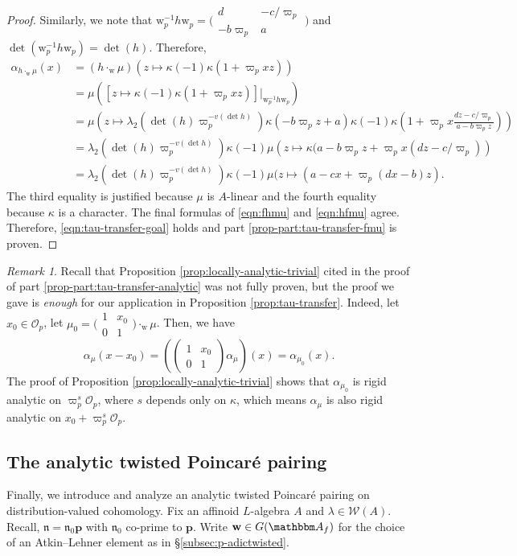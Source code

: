 \documentclass[10pt, twoside]{amsart}
\theoremstyle{plain}
\theoremstyle{definition}
\theoremstyle{remark}
\newtheorem{remark}[theorem]{Remark}
\numberwithin{equation}{subsection}
\def\A{\mathbbm A}
\def\p{\mathbf{p}}
\def\gn{\mathfrak n}
\def\scro{\mathscr O}
\def\scro{\mathscr O}
\def\scrw{\mathscr W}
\newcommand{\mat}[4]{\begin{pmatrix}#1&#2\\#3&#4\end{pmatrix}}
\newcommand{\smallmat}[4]{\bigl(\begin{smallmatrix}#1&#2\\#3&#4\end{smallmatrix}\bigr)}
\begin{document}
\begin{proof}
Similarly, we note that ${ \boldsymbol{\mathrm{w}}}_p^{-1}h { \boldsymbol{\mathrm{w}}}_p = \smallmat d{-c/\varpi_p}{-b\varpi_p}a$ and $\det({ \boldsymbol{\mathrm{w}}}_p^{-1}h{ \boldsymbol{\mathrm{w}}}_p) = \det(h)$. Therefore,
\begin{align}\label{eqn:fhmu}
\alpha_{h\cdot_{ \boldsymbol{\mathrm{w}}} \mu}(x) &= (h\cdot_{ \boldsymbol{\mathrm{w}}} \mu)\left(z \mapsto \kappa(-1)\kappa(1 + \varpi_p xz)\right)\\
&=  \mu\left(\left[z \mapsto \kappa(-1)\kappa(1+\varpi_p xz)\right]|_{{ \boldsymbol{\mathrm{w}}}_p^{-1}h { \boldsymbol{\mathrm{w}}}_p}\right)\nonumber \\
&= \mu \left(z \mapsto \lambda_2(\det(h)\varpi_p^{-v(\det h)}) \kappa(-b\varpi_p z + a) \kappa(-1)\kappa\left(1 + \varpi_p x\frac{dz - c/\varpi_p}{a - b\varpi_p z}\right)\right)\nonumber\\
&= \lambda_2(\det(h)\varpi_p^{-v(\det h)}) \kappa(-1)\mu\left(z \mapsto \kappa(a - b\varpi_p z + \varpi_p x(dz-c/\varpi_p)\right)\nonumber\\
&= \lambda_2(\det(h)\varpi_p^{-v(\det h)}) \kappa(-1)\mu(z \mapsto(a - cx + \varpi_p(dx-b)z).\nonumber
\end{align}
The third equality is justified because $\mu$ is $A$-linear and the fourth equality because $\kappa$ is a character. The final formulas of \eqref{eqn:fhmu} and \eqref{eqn:hfmu} agree. Therefore, \eqref{eqn:tau-transfer-goal} holds and part \ref{prop-part:tau-transfer-fmu} is proven.
\end{proof}

\begin{remark}\label{remark:there-is-no-gap}
Recall that Proposition \ref{prop:locally-analytic-trivial} cited in the proof of part \ref{prop-part:tau-transfer-analytic} was not fully proven, but the proof we gave is {\em enough} for our application in Proposition \ref{prop:tau-transfer}. Indeed, let $x_0 \in \scro_p$, let $\mu_0 = \smallmat 1{x_0}01\cdot_{ \boldsymbol{\mathrm{w}}} \mu$. Then, we have
$$
\alpha_\mu(x-x_0) = \left(\mat 1{x_0}01 \alpha_\mu\right)(x) = \alpha_{\mu_0}(x).
$$
The proof of Proposition \ref{prop:locally-analytic-trivial} shows that $\alpha_{\mu_0}$ is rigid analytic on $\varpi_p^s \scro_p$, where $s$ depends only on $\kappa$, which means $\alpha_\mu$ is also rigid analytic on $x_0 + \varpi_p^s \scro_p$.
\end{remark}

\subsection{The analytic twisted Poincar\'e pairing}\label{subsec:padic-cohomology} 
Finally, we introduce and analyze an analytic twisted Poincar\'e pairing on distribution-valued cohomology. Fix an affinoid $L$-algebra $A$ and $\lambda \in \scrw(A)$. Recall, $\gn = \gn_0 \p$ with $\gn_0$ co-prime to $\p$. Write ${ \boldsymbol{\mathrm{w}}} \in G(\A_f)$ for the choice of an Atkin--Lehner element as in \S \ref{subsec:p-adictwisted}. 
\end{document}
